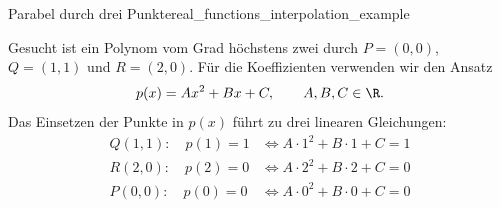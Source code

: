\begin{ExampleBox}{Parabel durch drei Punkte}{real_functions_interpolation_example}
  \begin{minipage}[t]{0.61\linewidth}
    \vspace{0pt}
    Gesucht ist ein Polynom vom Grad höchstens zwei durch
    $P=(0,0)$, $Q=(1,1)$ und $R=(2,0)$. Für die Koeffizienten verwenden wir
    den Ansatz
    \[
      p(x)=Ax^2+Bx+C,\qquad A,B,C\in\R.
    \]
    Das Einsetzen der Punkte in $p(x)$ führt zu drei linearen Gleichungen:
    \[
      \begin{aligned}
        Q(1,1):\quad p(1)=1
          &\Longleftrightarrow A\cdot1^2+B\cdot1+C=1\\[0.25em]
        R(2,0):\quad p(2)=0
          &\Longleftrightarrow A\cdot2^2+B\cdot2+C=0\\[0.25em]
        P(0,0):\quad p(0)=0
          &\Longleftrightarrow A\cdot0^2+B\cdot0+C=0
      \end{aligned}
    \]
  \end{minipage}\hfill
  \begin{minipage}[t]{0.36\linewidth}
    \vspace{0pt}\centering
  \end{minipage}


\end{ExampleBox}
